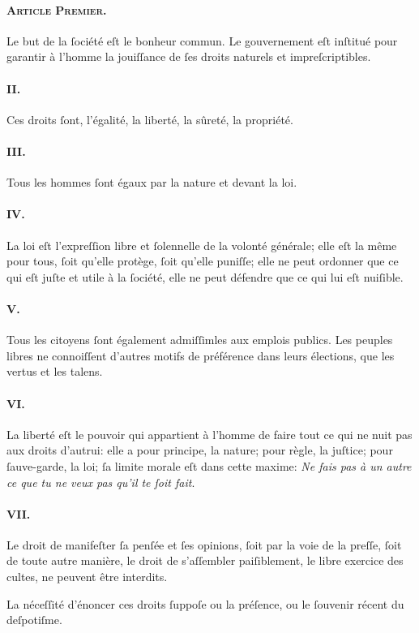\documentclass[10pt]{lecturenotes}
\begin{document}
\paragraph*{\textsc{Article Premier.\\}}
Le but de la ſociété eſt le bonheur commun.
Le gouvernement eſt inſtitué pour garantir à l'homme la jouiſſance de ſes droits naturels et impreſcriptibles.
\paragraph*{II.} Ces droits ſont, l'égalité, la liberté, la sûreté, la propriété.
\paragraph*{III.}Tous les hommes ſont égaux par la nature et devant la loi.
\paragraph*{IV.}La loi eſt l'expreſſion libre et ſolennelle de la volonté générale; elle eſt la même pour tous, ſoit qu'elle protège, ſoit qu'elle puniſſe; elle ne peut ordonner que ce qui eſt juſte et utile à la ſociété, elle ne peut défendre que ce qui lui eſt nuiſible.
\paragraph*{V.}Tous les citoyens ſont également admiſſimles aux emplois publics. Les peuples libres ne connoiſſent d'autres motifs de préférence dans leurs élections, que les vertus et les talens.
\paragraph*{VI.}La liberté eſt le pouvoir qui appartient à l'homme de faire tout ce qui ne nuit pas aux droits d'autrui: elle a pour principe, la nature; pour règle, la juſtice; pour ſauve-garde, la loi; ſa limite morale eſt dans cette maxime: \emph{Ne fais pas à un autre ce que tu ne veux pas qu'il te ſoit fait}.
\paragraph*{VII.}Le droit de manifeſter ſa penſée et ſes opinions, ſoit par la voie de la preſſe, ſoit de toute autre manière, le droit de s'aſſembler paiſiblement, le libre exercice des  cultes, ne peuvent être interdits.

La néceſſité d'énoncer ces droits ſuppoſe ou la préſence, ou le ſouvenir récent du deſpotiſme.
\end{document}
